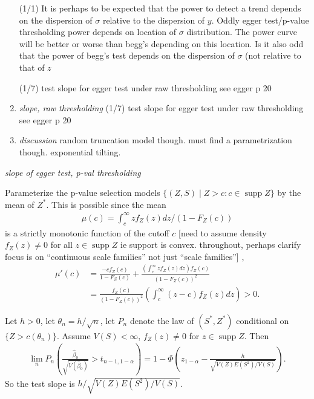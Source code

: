 \documentclass{article}
\newcommand{\E}{E}
\renewcommand{\P}{P}
\newcommand{\V}{V}
\newcommand{\sel}[1]{#1^*}
\DeclareMathOperator{\supp}{supp}
\begin{document}
\begin{enumerate}
  (1/1) It is perhaps to be expected that the power to detect a trend
  depends on the dispersion of $\sigma$ relative to the dispersion of
  $y$. Oddly egger test/p-value thresholding power depends on location
of $\sigma$ distribution. The power curve will be better or worse than
begg's depending on this location. Is it also odd that the power
of begg's test depends on the dispersion of $\sigma$ (not relative to that of $z$

(1/7) test slope for egger test under raw thresholding see egger p 20

\item\emph{slope, raw thresholding}
  (1/7) test slope for egger test under raw thresholding see egger p 20

\item\emph{discussion}
  random truncation model though. must find a parametrization though. exponential tilting.
\end{enumerate}


\emph{slope of egger test, p-val thresholding}

Parameterize the p-value selection
models $\{(Z,S) \mid Z>c: c\in \supp Z\}$ by the mean of $\sel
Z$. This is possible since the mean
\begin{align}
  \mu(c)=\int_c^\infty zf_Z(z)dz / (1-F_Z(c))
\end{align}
is a strictly monotonic function of the cutoff $c$ [need to assume density $f_Z(z)\neq 0$ for all $z\in\supp Z$ ie support is convex. throughout, perhaps clarify focus is on ``continuous scale families'' not just ``scale families''] ,
\begin{align}
  \mu'(c) &= \frac{-cf_Z(c)}{1-F_Z(c)} + \frac{\left(\int_c^{\infty}zf_Z(z)dz\right)f_Z(c)}{(1-F_Z(c))^2}\\
          &= \frac{f_Z(c)}{(1-F_Z(c))^2}\left(\int_c^{\infty}(z-c)f_Z(z)dz\right) > 0.
\end{align}

Let $h>0$, let $\theta_n=h/\sqrt{n}$, let $\P_n$ denote the law of $(\sel S,\sel Z)$ conditional on $\{Z>c(\theta_n)\}$. Assume $\V(S)<\infty$, $f_Z(z)\neq 0$ for $z\in\supp Z$. Then
\begin{align}
  \lim_n \P_n\left(\frac{\hat{\beta}_0}{\sqrt{\V(\hat{\beta}_0)}} >
  t_{n-1,1-\alpha}\right)= 1-\Phi\left(z_{1-\alpha} -
  \frac{h}{\sqrt{\V(Z)\E(S^2)/\V(S)}}\right).
\end{align}
So the test slope is $h/\sqrt{\V(Z)\E(S^2)/\V(S)}$.
\end{document}
